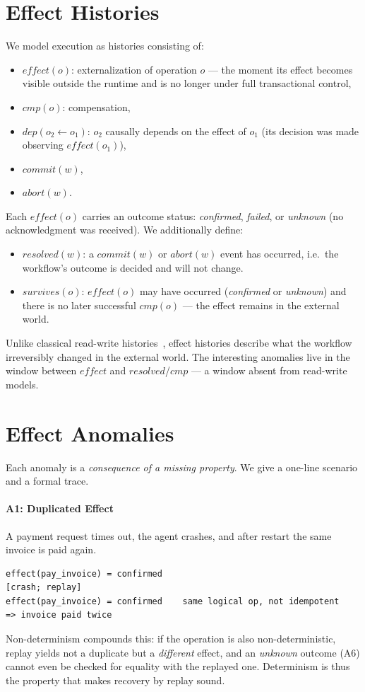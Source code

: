 \documentclass[11pt]{article}
\begin{document}
\section{Effect Histories}

We model execution as histories consisting of:

\begin{itemize}
\item $effect(o)$: externalization of operation $o$ --- the moment its
effect becomes visible outside the runtime and is no longer under full
transactional control,
\item $cmp(o)$: compensation,
\item $dep(o_2 \leftarrow o_1)$: $o_2$ causally depends on the effect of
$o_1$ (its decision was made observing $effect(o_1)$),
\item $commit(w)$,
\item $abort(w)$.
\end{itemize}

Each $effect(o)$ carries an outcome status: \emph{confirmed},
\emph{failed}, or \emph{unknown} (no acknowledgment was received). We
additionally define:

\begin{itemize}
\item $resolved(w)$: a $commit(w)$ or $abort(w)$ event has occurred, i.e.\
the workflow's outcome is decided and will not change.
\item $survives(o)$: $effect(o)$ may have occurred (\emph{confirmed} or
\emph{unknown}) and there is no later successful $cmp(o)$ --- the effect
remains in the external world.
\end{itemize}

Unlike classical read-write histories~\cite{adya1999},
effect histories describe what the workflow irreversibly changed in the
external world. The interesting anomalies live in the window between
$effect$ and $resolved$/$cmp$ --- a window absent from read-write models.

\section{Effect Anomalies}

Each anomaly is a \emph{consequence of a missing property}. We give a
one-line scenario and a formal trace.

\paragraph{A1: Duplicated Effect}
A payment request times out, the agent crashes, and after restart the
same invoice is paid again.
\begin{verbatim}
effect(pay_invoice) = confirmed
[crash; replay]
effect(pay_invoice) = confirmed    same logical op, not idempotent
=> invoice paid twice
\end{verbatim}
Non-determinism compounds this: if the operation is also non-deterministic,
replay yields not a duplicate but a \emph{different} effect, and an
\emph{unknown} outcome (A6) cannot even be checked for equality with the
replayed one. Determinism is thus the property that makes recovery by
replay sound.
\end{document}
